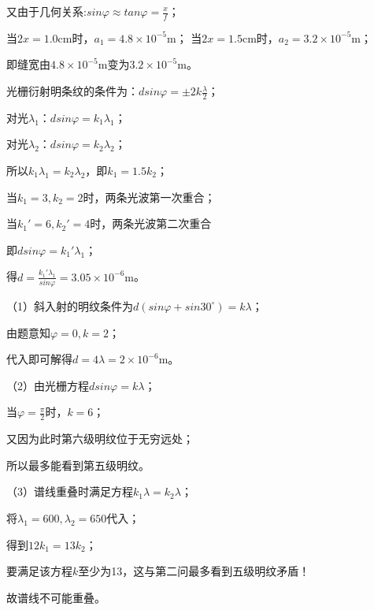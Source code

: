 又由于几何关系:$sin\varphi\approx tan\varphi=\frac{x}{f}$；

当$2x=1.0\mathrm{cm}$时，$a_1=4.8\times10^{-5}\mathrm{m}$；
当$2x=1.5\mathrm{cm}$时，$a_2=3.2\times10^{-5}\mathrm{m}$；

即缝宽由$4.8\times10^{-5}\mathrm{m}$变为$3.2\times10^{-5}\mathrm{m}$。

\exercise

\solve
光栅衍射明条纹的条件为：$dsin\varphi=\pm2k\frac{\lambda}{2}$；

对光$\lambda_1$：$dsin\varphi=k_1\lambda_1$；

对光$\lambda_2$：$dsin\varphi=k_2\lambda_2$；

所以$k_1\lambda_1=k_2\lambda_2$，即$k_1=1.5k_2$；

当$k_1=3,k_2=2$时，两条光波第一次重合；

当$k_1'=6,k_2'=4$时，两条光波第二次重合

即$dsin\varphi=k_1'\lambda_1$；

得$d=\frac{k_1'\lambda_1}{sin\varphi}=3.05\times10^{-6}\mathrm{m}$。

\exercise

\solve
（1）斜入射的明纹条件为$d(sin\varphi+sin30^{\circ})=k\lambda$；

由题意知$\varphi=0,k=2$；

代入即可解得$d=4\lambda=2\times10^{-6}\mathrm{m}$。

（2）由光栅方程$dsin\varphi=k\lambda$；

当$\varphi=\frac{\pi}{2}$时，$k=6$；

又因为此时第六级明纹位于无穷远处；

所以最多能看到第五级明纹。

（3）谱线重叠时满足方程$k_1\lambda=k_2\lambda$；

将$\lambda_1=600,\lambda_2=650$代入；

得到$12k_1=13k_2$；

要满足该方程$k$至少为13，这与第二问最多看到五级明纹矛盾！

故谱线不可能重叠。
